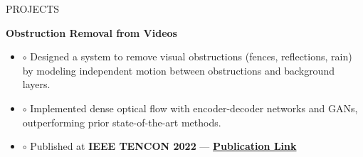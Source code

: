 \documentclass[10pt]{resume}
\begin{document}
\begin{rSection}{PROJECTS}

\textbf{Obstruction Removal from Videos}
\begin{itemize}
\item[] $\circ$ Designed a system to remove visual obstructions (fences, reflections, rain) by modeling independent motion between obstructions and background layers.
\item[] $\circ$ Implemented dense optical flow with encoder-decoder networks and GANs, outperforming prior state-of-the-art methods.
\item[] $\circ$ Published at \textbf{IEEE TENCON 2022} —
\href{https://ieeexplore.ieee.org/abstract/document/9977584}{\textbf{Publication Link}}
\end{itemize}


\end{rSection}


\end{document}
